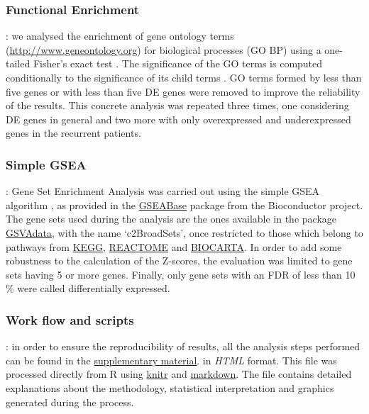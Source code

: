 \documentclass[9pt,twocolumn,twoside]{gsajnl}
\begin{document}
\subsubsection*{Functional Enrichment}: we analysed the enrichment of gene ontology terms (\url{http://www.geneontology.org}) for biological processes (GO BP) using a one-tailed Fisher's exact test \citep{Fisher1922}. The significance of the GO terms is computed conditionally to the significance of its child terms \citep{Alexa2006}. GO terms formed by less than five genes or with less than five DE genes were removed to improve the reliability of the results. This concrete analysis was repeated three times, one considering DE genes in general and two more with only overexpressed and underexpressed genes in the recurrent patients. 

\subsubsection*{Simple GSEA}: Gene Set Enrichment Analysis \citep{Subramanian2005} was carried out using the simple GSEA algorithm \citep{Irizarry2009}, as provided in the \href{http://www.bioconductor.org/packages/release/bioc/html/GSEABase.html}{GSEABase} package from the Bioconductor project. The gene sets used during the analysis are the ones available in the package \href{http://www.bioconductor.org/packages/release/data/experiment/html/GSVAdata.html}{GSVAdata}, with the name `c2BroadSets', once restricted to those which belong to pathways from \href{http://www.genome.jp/kegg/pathway.html}{KEGG}, \href{http://www.reactome.org/}{REACTOME} and \href{http://www.biocarta.com/}{BIOCARTA}. In order to add some robustness to the calculation of the Z-scores, the evaluation was limited to gene sets having 5 or more genes. Finally, only gene sets with an FDR of less than 10 \% were called differentially expressed.

\subsubsection*{Work flow and scripts}: in order to ensure the reproducibility of results, all the analysis steps performed can be found in the \href{http://ieoproject.tk/ieo/abella_casals_miravet.html}{supplementary material}. in \textit{HTML} format. This file was processed directly from R using 
\href{http://cran.r-project.org/web/packages/knitr/index.html}{knitr} and \href{http://cran.r-project.org/web/packages/markdown/index.html}{markdown}. The file contains detailed explanations about the methodology, statistical interpretation and graphics generated during the process. 
\end{document}
